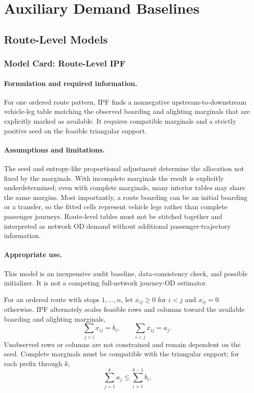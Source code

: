 
\section{Auxiliary Demand Baselines}
\subsection{Route-Level Models}

\subsubsection{Model Card: Route-Level IPF}

\paragraph{Formulation and required information.}
For one ordered route pattern, IPF finds a nonnegative upstream-to-downstream
vehicle-leg table matching the observed boarding and alighting marginals that
are explicitly marked as available.  It requires compatible marginals and a
strictly positive seed on the feasible triangular support.

\paragraph{Assumptions and limitations.}
The seed and entropy-like proportional adjustment determine the allocation not
fixed by the marginals.  With incomplete marginals the result is explicitly
underdetermined; even with complete marginals, many interior tables may share
the same margins.  Most importantly, a route boarding can be an initial
boarding or a transfer, so the fitted cells represent vehicle legs rather than
complete passenger journeys.  Route-level tables must not be stitched together
and interpreted as network OD demand without additional passenger-trajectory
information.

\paragraph{Appropriate use.}
This model is an inexpensive audit baseline, data-consistency check, and
possible initializer.  It is not a competing full-network journey-OD estimator.

For an ordered route with stops $1,\ldots,n$, let $x_{ij}\geq0$ for $i<j$ and
$x_{ij}=0$ otherwise. IPF alternately scales feasible rows and columns toward
the available boarding and alighting marginals,
\[
 \sum_{j>i}x_{ij}=b_i,
 \qquad
 \sum_{i<j}x_{ij}=a_j.
\]
Unobserved rows or columns are not constrained and remain dependent on the
seed. Complete marginals must be compatible with the triangular support; for
each prefix through $k$,
\[
 \sum_{j=1}^{k}a_j\leq\sum_{i=1}^{k-1}b_i.
\]
